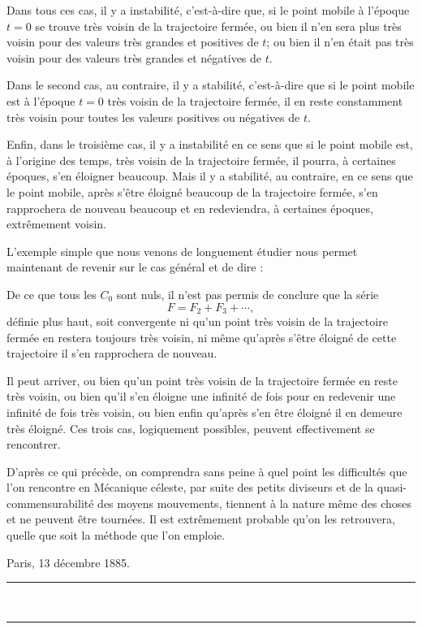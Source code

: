 \documentclass[11pt]{article}
\newcommand{\ornament}{\begin{center}\rule{2.5em}{0.4pt}\,\raisebox{0.1ex}{\tiny$\bullet\bullet\bullet$}\,\rule{2.5em}{0.4pt}\end{center}}
\begin{document}
Dans tous ces cas, il y a instabilité, c’est-à-dire que, si le point mobile à l’époque $t=0$ se trouve très voisin de la trajectoire fermée, ou bien il n’en sera plus très voisin pour des valeurs très grandes et positives de $t$; ou bien il n’en était pas très voisin pour des valeurs très grandes et négatives de $t$.

Dans le second cas, au contraire, il y a stabilité, c’est-à-dire que si le point mobile est à l’époque $t=0$ très voisin de la trajectoire fermée, il en reste constamment très voisin pour toutes les valeurs positives ou négatives de $t$.

Enfin, dans le troisième cas, il y a instabilité en ce sens que si le point mobile est, à l’origine des temps, très voisin de la trajectoire fermée, il pourra, à certaines époques, s’en éloigner beaucoup. Mais il y a stabilité, au contraire, en ce sens que le point mobile, après s’être éloigné beaucoup de la trajectoire fermée, s’en rapprochera de nouveau beaucoup et en redeviendra, à certaines époques, extrêmement voisin.

L’exemple simple que nous venons de longuement étudier nous permet maintenant de revenir sur le cas général et de dire :

De ce que tous les $C_0$ sont nuls, il n’est pas permis de conclure que la série
\[
F=F_2+F_3+\cdots,
\]
définie plus haut, soit convergente ni qu’un point très voisin de la trajectoire fermée en restera toujours très voisin, ni même qu’après s’être éloigné de cette trajectoire il s’en rapprochera de nouveau.

Il peut arriver, ou bien qu’un point très voisin de la trajectoire fermée en reste très voisin, ou bien qu’il s’en éloigne une infinité de fois pour en redevenir une infinité de fois très voisin, ou bien enfin qu’après s’en être éloigné il en demeure très éloigné. Ces trois cas, logiquement possibles, peuvent effectivement se rencontrer.

D’après ce qui précède, on comprendra sans peine à quel point les difficultés que l’on rencontre en Mécanique céleste, par suite des petits diviseurs et de la quasi-commensurabilité des moyens mouvements, tiennent à la nature même des choses et ne peuvent être tournées. Il est extrêmement probable qu’on les retrouvera, quelle que soit la méthode que l’on emploie.

\begin{flushleft}
Paris, 13 décembre 1885.
\end{flushleft}

\ornament
\end{document}
